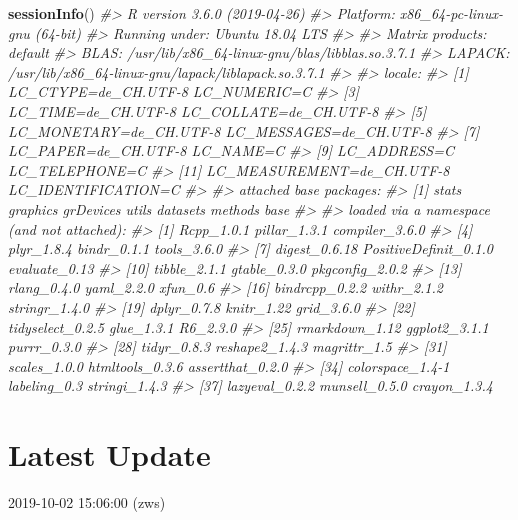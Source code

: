 \documentclass[]{article}
\newenvironment{Shaded}{\begin{snugshade}}{\end{snugshade}}
\newcommand{\KeywordTok}[1]{\textcolor[rgb]{0.13,0.29,0.53}{\textbf{#1}}}
\newcommand{\CommentTok}[1]{\textcolor[rgb]{0.56,0.35,0.01}{\textit{#1}}}
\newcommand{\NormalTok}[1]{#1}
\begin{document}
\begin{Shaded}
\begin{Highlighting}[]
\KeywordTok{sessionInfo}\NormalTok{()}
\CommentTok{#> R version 3.6.0 (2019-04-26)}
\CommentTok{#> Platform: x86_64-pc-linux-gnu (64-bit)}
\CommentTok{#> Running under: Ubuntu 18.04 LTS}
\CommentTok{#> }
\CommentTok{#> Matrix products: default}
\CommentTok{#> BLAS:   /usr/lib/x86_64-linux-gnu/blas/libblas.so.3.7.1}
\CommentTok{#> LAPACK: /usr/lib/x86_64-linux-gnu/lapack/liblapack.so.3.7.1}
\CommentTok{#> }
\CommentTok{#> locale:}
\CommentTok{#>  [1] LC_CTYPE=de_CH.UTF-8       LC_NUMERIC=C              }
\CommentTok{#>  [3] LC_TIME=de_CH.UTF-8        LC_COLLATE=de_CH.UTF-8    }
\CommentTok{#>  [5] LC_MONETARY=de_CH.UTF-8    LC_MESSAGES=de_CH.UTF-8   }
\CommentTok{#>  [7] LC_PAPER=de_CH.UTF-8       LC_NAME=C                 }
\CommentTok{#>  [9] LC_ADDRESS=C               LC_TELEPHONE=C            }
\CommentTok{#> [11] LC_MEASUREMENT=de_CH.UTF-8 LC_IDENTIFICATION=C       }
\CommentTok{#> }
\CommentTok{#> attached base packages:}
\CommentTok{#> [1] stats     graphics  grDevices utils     datasets  methods   base     }
\CommentTok{#> }
\CommentTok{#> loaded via a namespace (and not attached):}
\CommentTok{#>  [1] Rcpp_1.0.1            pillar_1.3.1          compiler_3.6.0       }
\CommentTok{#>  [4] plyr_1.8.4            bindr_0.1.1           tools_3.6.0          }
\CommentTok{#>  [7] digest_0.6.18         PositiveDefinit_0.1.0 evaluate_0.13        }
\CommentTok{#> [10] tibble_2.1.1          gtable_0.3.0          pkgconfig_2.0.2      }
\CommentTok{#> [13] rlang_0.4.0           yaml_2.2.0            xfun_0.6             }
\CommentTok{#> [16] bindrcpp_0.2.2        withr_2.1.2           stringr_1.4.0        }
\CommentTok{#> [19] dplyr_0.7.8           knitr_1.22            grid_3.6.0           }
\CommentTok{#> [22] tidyselect_0.2.5      glue_1.3.1            R6_2.3.0             }
\CommentTok{#> [25] rmarkdown_1.12        ggplot2_3.1.1         purrr_0.3.0          }
\CommentTok{#> [28] tidyr_0.8.3           reshape2_1.4.3        magrittr_1.5         }
\CommentTok{#> [31] scales_1.0.0          htmltools_0.3.6       assertthat_0.2.0     }
\CommentTok{#> [34] colorspace_1.4-1      labeling_0.3          stringi_1.4.3        }
\CommentTok{#> [37] lazyeval_0.2.2        munsell_0.5.0         crayon_1.3.4}
\end{Highlighting}
\end{Shaded}

\section{Latest Update}\label{latest-update}

2019-10-02 15:06:00 (zws)
\end{document}
